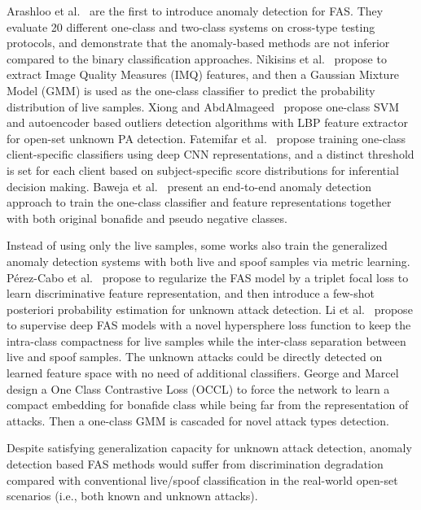 \documentclass[10pt,journal,compsoc]{IEEEtran}
\begin{document}
Arashloo et al.~\cite{arashloo2017anomaly} are the first to introduce anomaly detection for FAS. They evaluate 20 different one-class and two-class systems on cross-type testing protocols, and demonstrate that the anomaly-based methods are not inferior compared to the binary classification approaches. Nikisins et al.~\cite{nikisins2018effectiveness} propose to extract Image Quality Measures (IMQ) features, and then a Gaussian Mixture Model (GMM) is used as the one-class classifier to predict the probability distribution of live samples. Xiong and AbdAlmageed~\cite{xiong2018unknown} propose one-class SVM and autoencoder based outliers
detection algorithms with LBP feature extractor for open-set unknown PA detection. Fatemifar et al.~\cite{fatemifar2019spoofing,fatemifar2020stacking,fatemifar2020client} propose training one-class client-specific classifiers using deep CNN representations, and a distinct threshold is set for each client based on subject-specific score distributions for inferential decision making. Baweja et al.~\cite{baweja2020anomaly} present an end-to-end anomaly detection approach to train the one-class classifier and feature representations together with both original bonafide and pseudo negative classes.



Instead of using only the live samples, some works also train the generalized anomaly detection systems with both live and spoof samples via metric learning. P{\'e}rez-Cabo et al.~\cite{perez2019deep} propose to regularize the FAS model by a triplet focal loss to learn discriminative feature representation, and then introduce a few-shot posteriori probability estimation for unknown attack detection. Li et al.~\cite{li2020unseen} propose to supervise deep FAS models with a novel hypersphere loss function to keep the intra-class compactness for live samples while the inter-class separation between live and spoof samples. The unknown attacks could be directly detected on learned feature space with no need of additional classifiers. George and Marcel~\cite{george2020learning} design a One Class Contrastive Loss (OCCL) to force the network to learn a compact embedding for bonafide class while being far from the representation
of attacks. Then a one-class GMM is cascaded for novel attack types detection.

Despite satisfying generalization capacity for unknown attack detection, anomaly detection based FAS methods would suffer from discrimination degradation compared with conventional live/spoof classification in the real-world open-set scenarios (i.e., both known and unknown attacks). 
\end{document}
